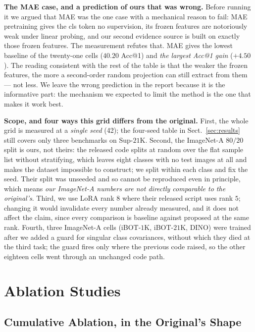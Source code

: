 \documentclass[11pt,a4paper]{article}
\begin{document}
\textbf{The MAE case, and a prediction of ours that was wrong.} Before running
it we argued that MAE was the one case with a mechanical reason to fail: MAE
pretraining gives the cls token no supervision, its frozen features are
notoriously weak under linear probing, and our second evidence source is built
on exactly those frozen features. The measurement refutes that. MAE gives the
lowest baseline of the twenty-one cells ($40.20$ Acc@1) and \emph{the largest
Acc@1 gain} ($+4.50$). The reading consistent with the rest of the table is that
the weaker the frozen features, the more a second-order random projection can
still extract from them --- not less. We leave the wrong prediction in the
report because it is the informative part: the mechanism we expected to limit
the method is the one that makes it work best.

\textbf{Scope, and four ways this grid differs from the original.} First, the
whole grid is measured at a \emph{single seed} (42); the four-seed table in
Sect.~\ref{sec:results} still covers only three benchmarks on Sup-$21$K.
Second, the ImageNet-A $80/20$ split is ours, not theirs: the released code
splits at random over the flat sample list without stratifying, which leaves
eight classes with no test images at all and makes the dataset impossible to
construct; we split within each class and fix the seed. Their split was unseeded
and so cannot be reproduced even in principle, which means \emph{our ImageNet-A
numbers are not directly comparable to the original's}. Third, we use LoRA rank
$8$ where their released script uses rank $5$; changing it would invalidate
every number already measured, and it does not affect the claim, since every
comparison is baseline against proposed at the same rank. Fourth, three
ImageNet-A cells (iBOT-$1$K, iBOT-$21$K, DINO) were trained after we added a
guard for singular class covariances, without which they died at the third
task; the guard fires only where the previous code raised, so the other
eighteen cells went through an unchanged code path.

\section{Ablation Studies}

\subsection{Cumulative Ablation, in the Original's Shape}
\label{sec:cumulative}
\end{document}
